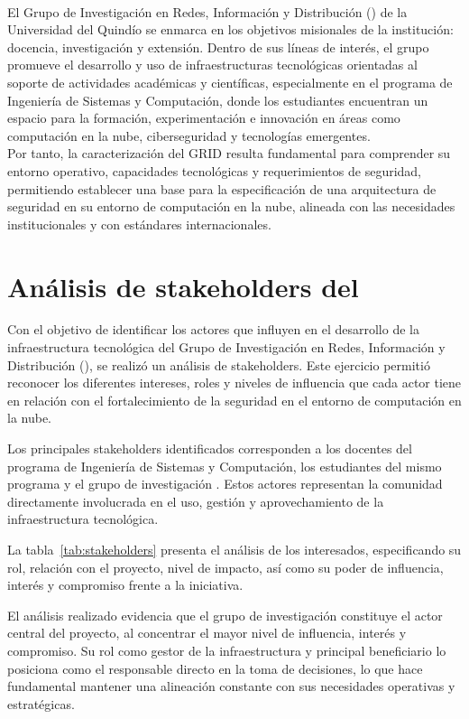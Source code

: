 \label{cap:caracterizacionGRID}
\mbox{}\\
\noindent
El Grupo de Investigación en Redes, Información y Distribución (\GRID) de la Universidad del Quindío se enmarca en los objetivos 
misionales de la institución: docencia, investigación y extensión. Dentro de sus líneas de interés, el grupo promueve el desarrollo y 
uso de infraestructuras tecnológicas orientadas al soporte de actividades académicas y científicas, especialmente en el programa de 
Ingeniería de Sistemas y Computación, donde los estudiantes encuentran un espacio para la formación, experimentación e innovación en 
áreas como computación en la nube, ciberseguridad y tecnologías emergentes.\\

Por tanto, la caracterización del GRID resulta fundamental para comprender su entorno operativo, capacidades tecnológicas y requerimientos 
de seguridad, permitiendo establecer una base para la especificación de una arquitectura de seguridad en su entorno de computación en 
la nube, alineada con las necesidades institucionales y con estándares internacionales.

\section{Análisis de stakeholders del \GRID}
\noindent
Con el objetivo de identificar los actores que influyen en el desarrollo de la infraestructura tecnológica del Grupo de Investigación en 
Redes, Información y Distribución (\GRID), se realizó un análisis de stakeholders. Este ejercicio permitió reconocer los diferentes 
intereses, roles y niveles de influencia que cada actor tiene en relación con el fortalecimiento de la seguridad en el entorno de 
computación en la nube.

Los principales stakeholders identificados corresponden a los docentes del programa de Ingeniería de Sistemas y Computación, los 
estudiantes del mismo programa y el grupo de investigación \GRID. Estos actores representan la comunidad directamente involucrada en el 
uso, gestión y aprovechamiento de la infraestructura tecnológica.

La tabla~\ref{tab:stakeholders} presenta el análisis de los interesados, especificando su rol, relación con el proyecto, nivel de 
impacto, así como su poder de influencia, interés y compromiso frente a la iniciativa.

El análisis realizado evidencia que el grupo de investigación \GRID constituye el actor central del proyecto, al concentrar el mayor 
nivel de influencia, interés y compromiso. Su rol como gestor de la infraestructura y principal beneficiario lo posiciona como el 
responsable directo en la toma de decisiones, lo que hace fundamental mantener una alineación constante con sus necesidades operativas 
y estratégicas.

